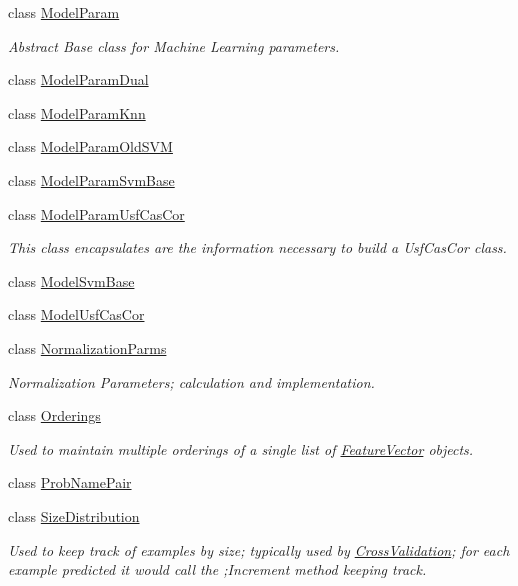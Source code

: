 \begin{DoxyCompactItemize}
class \hyperlink{class_k_k_m_l_l_1_1_model_param}{Model\+Param}
\begin{DoxyCompactList}\small\item\em Abstract Base class for Machine Learning parameters. \end{DoxyCompactList}\item 
class \hyperlink{class_k_k_m_l_l_1_1_model_param_dual}{Model\+Param\+Dual}
\item 
class \hyperlink{class_k_k_m_l_l_1_1_model_param_knn}{Model\+Param\+Knn}
\item 
class \hyperlink{class_k_k_m_l_l_1_1_model_param_old_s_v_m}{Model\+Param\+Old\+S\+VM}
\item 
class \hyperlink{class_k_k_m_l_l_1_1_model_param_svm_base}{Model\+Param\+Svm\+Base}
\item 
class \hyperlink{class_k_k_m_l_l_1_1_model_param_usf_cas_cor}{Model\+Param\+Usf\+Cas\+Cor}
\begin{DoxyCompactList}\small\item\em This class encapsulates are the information necessary to build a Usf\+Cas\+Cor class. \end{DoxyCompactList}\item 
class \hyperlink{class_k_k_m_l_l_1_1_model_svm_base}{Model\+Svm\+Base}
\item 
class \hyperlink{class_k_k_m_l_l_1_1_model_usf_cas_cor}{Model\+Usf\+Cas\+Cor}
\item 
class \hyperlink{class_k_k_m_l_l_1_1_normalization_parms}{Normalization\+Parms}
\begin{DoxyCompactList}\small\item\em Normalization Parameters; calculation and implementation. \end{DoxyCompactList}\item 
class \hyperlink{class_k_k_m_l_l_1_1_orderings}{Orderings}
\begin{DoxyCompactList}\small\item\em Used to maintain multiple orderings of a single list of \hyperlink{class_k_k_m_l_l_1_1_feature_vector}{Feature\+Vector} objects. \end{DoxyCompactList}\item 
class \hyperlink{class_k_k_m_l_l_1_1_prob_name_pair}{Prob\+Name\+Pair}
\item 
class \hyperlink{class_k_k_m_l_l_1_1_size_distribution}{Size\+Distribution}
\begin{DoxyCompactList}\small\item\em Used to keep track of examples by size; typically used by \textquotesingle{}\hyperlink{class_k_k_m_l_l_1_1_cross_validation}{Cross\+Validation}\textquotesingle{}; for each example predicted it would call the ;Increment\textquotesingle{} method keeping track. \end{DoxyCompactList}\item 

\end{DoxyCompactItemize}
